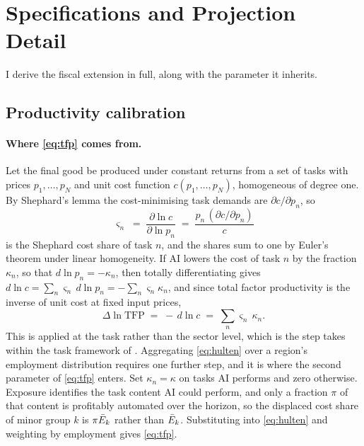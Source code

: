 \section{Specifications and Projection Detail}\label{app:specifications}

I derive the fiscal extension in full, along with the parameter it inherits.

\subsection{Productivity calibration}

\paragraph{Where \cref{eq:tfp} comes from.} Let the final good be produced under constant returns from a set of tasks with prices $p_1, \dots, p_N$ and unit cost function $c(p_1, \dots, p_N)$, homogeneous of degree one. By Shephard's lemma the cost-minimising task demands are $\partial c / \partial p_n$, so
\begin{equation}\label{eq:shares}
\varsigma_n \;=\; \frac{\partial \ln c}{\partial \ln p_n}
\;=\; \frac{p_n \, (\partial c / \partial p_n)}{c}
\end{equation}
is the Shephard cost share of task $n$, and the shares sum to one by Euler's theorem under linear homogeneity. If AI lowers the cost of task $n$ by the fraction $\kappa_n$, so that $d \ln p_n = -\kappa_n$, then totally differentiating gives $d \ln c = \sum_n \varsigma_n \, d\ln p_n = - \sum_n \varsigma_n \kappa_n$, and since total factor productivity is the inverse of unit cost at fixed input prices,
\begin{equation}\label{eq:hulten}
\Delta \ln \mathrm{TFP} \;=\; -\, d \ln c \;=\; \sum_n \varsigma_n \, \kappa_n .
\end{equation}
This is \citet{hulten1978} applied at the task rather than the sector level, which is the step \citet{acemoglu2025} takes within the task framework of \citet{acemoglu2019}. Aggregating \cref{eq:hulten} over a region's employment distribution requires one further step, and it is where the second parameter of \cref{eq:tfp} enters. Set $\kappa_n = \kappa$ on tasks AI performs and zero otherwise. Exposure identifies the task content AI could perform, and only a fraction $\pi$ of that content is profitably automated over the horizon, so the displaced cost share of minor group $k$ is $\pi \bar{E}_k$ rather than $\bar{E}_k$. Substituting into \cref{eq:hulten} and weighting by employment gives \cref{eq:tfp}. 


